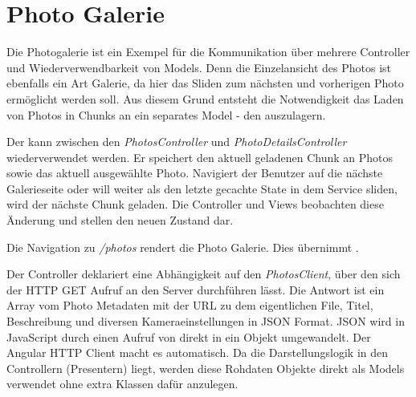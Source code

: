 \section{Photo Galerie}

Die Photogalerie ist ein Exempel für die Kommunikation über mehrere Controller und Wiederverwendbarkeit von Models. Denn die Einzelansicht des Photos ist ebenfalls ein Art Galerie, da hier das Sliden zum nächsten und vorherigen Photo ermöglicht werden soll. Aus diesem Grund entsteht die Notwendigkeit das Laden von Photos in Chunks an ein separates Model - den  auszulagern. 

Der  kann zwischen den \textit{PhotosController} und \textit{PhotoDetailsController} wiederverwendet werden. Er speichert den aktuell geladenen Chunk an Photos sowie das aktuell ausgewählte Photo. Navigiert der Benutzer auf die nächste Galerieseite oder will weiter als den letzte gecachte State in dem Service sliden, wird der nächste Chunk geladen. Die Controller und Views beobachten diese Änderung und stellen den neuen Zustand dar.



Die Navigation zu \textit{/photos} rendert die Photo Galerie. Dies übernimmt  . 


Der Controller deklariert eine Abhängigkeit auf den \textit{PhotosClient}, über den sich der HTTP GET Aufruf an den Server durchführen lässt. Die Antwort ist ein Array vom Photo Metadaten mit der URL zu dem eigentlichen File, Titel, Beschreibung und diversen Kameraeinstellungen in JSON Format. JSON wird in JavaScript durch einen Aufruf von  direkt in ein Objekt umgewandelt. Der Angular HTTP Client macht es automatisch. Da die Darstellungslogik in den Controllern (Presentern) liegt, werden diese Rohdaten Objekte direkt als Models verwendet ohne extra Klassen dafür anzulegen.





